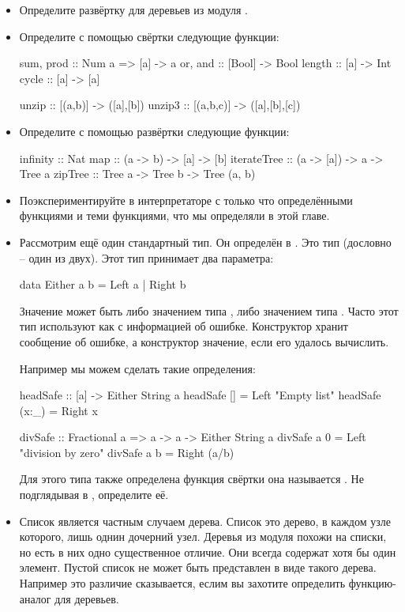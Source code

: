 \begin{itemize}
\item
  Определите развёртку для деревьев из модуля .
\item
  Определите с помощью свёртки следующие функции:


  \begin{code}
  sum, prod  :: Num a => [a] -> a
  or,  and   :: [Bool] -> Bool
  length     :: [a] -> Int
  cycle      :: [a] -> [a]

  unzip      :: [(a,b)] -> ([a],[b])
  unzip3     :: [(a,b,c)] -> ([a],[b],[c])
  \end{code}
\item
  Определите с помощью развёртки следующие функции:


  \begin{code}
  infinity    :: Nat
  map         :: (a -> b) -> [a] -> [b]
  iterateTree :: (a -> [a]) -> a -> Tree a
  zipTree     :: Tree a -> Tree b -> Tree (a, b)
  \end{code}
\item
  Поэкспериментируйте в интерпретаторе с только что определёнными
  функциями и теми функциями, что мы определяли в этой главе.
\item
  Рассмотрим ещё один стандартный тип. Он определён в . Это
  тип  (дословно -- один из двух). Этот тип принимает два
  параметра:


  \begin{code}
  data Either a b = Left a | Right b
  \end{code}

  Значение может быть либо значением типа , либо значением типа
  . Часто этот тип используют как  с информацией об
  ошибке. Конструктор  хранит сообщение об ошибке, а
  конструктор  значение, если его удалось вычислить.

  Например мы можем сделать такие определения:


  \begin{code}
  headSafe :: [a] -> Either String a
  headSafe []     = Left "Empty list" 
  headSafe (x:_)  = Right x

  divSafe :: Fractional a => a -> a -> Either String a
  divSafe a 0 = Left "division by zero"
  divSafe a b = Right (a/b)
  \end{code}

  Для этого типа также определена функция свёртки она называется
  . Не подглядывая в , определите её.
\item
  Список является частным случаем дерева. Список это дерево, в каждом
  узле которого, лишь однин дочерний узел. Деревья из модуля
   похожи на списки, но есть в них одно существенное
  отличие. Они всегда содержат хотя бы один элемент. Пустой список не
  может быть представлен в виде такого дерева. Например это различие
  сказывается, еслим вы захотите определить функцию-аналог
   для деревьев.


\end{itemize}
